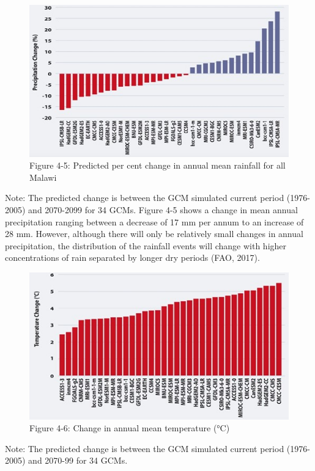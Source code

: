 \documentclass[
]{book}
\begin{document}
\begin{figure}
\centering
\includegraphics{images/future_ppt_allmodels.jpg}
\caption{Figure 4-5: Predicted per cent change in annual mean rainfall for all Malawi}
\end{figure}

Note: The predicted change is between the GCM simulated current period (1976-2005) and 2070-2099 for 34 GCMs.
Figure 4-5 shows a change in mean annual precipitation ranging between a decrease of 17 mm per annum to an increase of 28 mm. However, although there will only be relatively small changes in annual precipitation, the distribution of the rainfall events will change with higher concentrations of rain separated by longer dry periods (FAO, 2017).

\begin{figure}
\centering
\includegraphics{images/future_temp_allmodels.jpg}
\caption{Figure 4-6: Change in annual mean temperature (°C)}
\end{figure}

Note: The predicted change is between the GCM simulated current period (1976- 2005) and 2070-99 for 34 GCMs.
\end{document}
